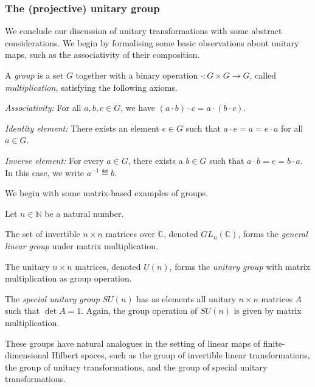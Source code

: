 \documentclass[a4paper,oneside, 12pt]{amsart}
\begin{document}
\subsubsection{The (projective) unitary group}\label{sec:the-(projective)-unitary-group}
We conclude our discussion of unitary transformations with some abstract considerations.
We begin by formalising some basic observations about unitary maps, such as the associativity of their composition.

\begin{definition}\label{def:group}
  A \emph{group} is a set \( G \) together with a binary operation \( \cdot \colon G \times G \to G \), called \emph{multiplication}, satisfying the following axioms.
  \begin{thmlist}
    \item \emph{Associativity:} For all \( a, b, c \in G \), we have \( (a \cdot b) \cdot c = a \cdot (b \cdot c) \).
    \item \emph{Identity element:} There exists an element \( e \in G \) such that \( a \cdot e = a = e \cdot a \) for all \( a \in G \).
    \item \emph{Inverse element:} For every \( a \in G \), there exists a \( b \in G \) such that \( a \cdot b = e = b \cdot a \). In this case, we write \( a^{-1} \eqdef b \).
  \end{thmlist}
\end{definition}

We begin with some matrix-based examples of groups.

\begin{example}\label{ex:invertible-matrices}
  Let \(n\in \mathbb{N}\) be a natural number.
  \begin{thmlist}
    \item The set of invertible \( n \times n \) matrices over \( \mathbb{C} \), denoted \( GL_{n}(\mathbb{C}) \), forms the \emph{general linear group} under matrix multiplication.
    \item The unitary \( n \times n \) matrices, denoted \( U(n) \), forms  the \emph{unitary group} with  matrix multiplication as group operation.
    \item The \emph{special unitary group} \(SU(n)\) has as elements all unitary \( n \times n \) matrices \(A\) such that \(\det A =1\).
    Again, the group operation of \(SU(n)\) is given by matrix multiplication.
  \end{thmlist}
\end{example}
These groups have natural analogues in the setting of linear maps of finite-dimensional Hilbert spaces, such as the group of invertible linear transformations, the group of unitary transformations, and the group of special unitary transformations.
\end{document}
